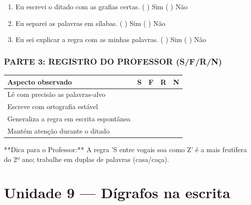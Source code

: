 \begin{exercicio}
\begin{enumerate}[label=\alph*)]
  \item Eu escrevi o ditado com as grafias certas.  \quad ( ) Sim   ( ) Não

  \item Eu separei as palavras em sílabas.  \quad ( ) Sim   ( ) Não

  \item Eu sei explicar a regra com as minhas palavras.  \quad ( ) Sim   ( ) Não

\end{enumerate}

\subsection*{PARTE 3: REGISTRO DO PROFESSOR (S/F/R/N)}

\begin{center}
\renewcommand{\arraystretch}{1.4}
\begin{tabular}{@{}p{9cm}cccc@{}}
\toprule
Aspecto observado & S & F & R & N \\
\midrule
Lê com precisão as palavras-alvo & & & & \\
Escreve com ortografia estável & & & & \\
Generaliza a regra em escrita espontânea & & & & \\
Mantém atenção durante o ditado & & & & \\
\bottomrule\end{tabular}\end{center}

\end{exercicio}

\begin{dica}
**Dica para o Professor:** A regra 'S entre vogais soa como Z' é a mais frutífera do 2º ano; trabalhe em duplas de palavras (casa/caça).
\end{dica}


\chapter{Unidade 9 --- Dígrafos na escrita}


